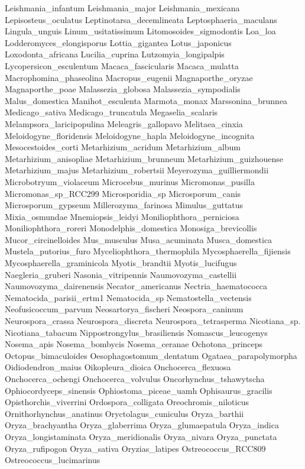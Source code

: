 \documentclass[letterpaper,10pt,english]{sphinxmanual}
\begin{document}
{\begin{sphinxVerbatim}[commandchars=\\\{\}]
Leishmania\_infantum
Leishmania\_major
Leishmania\_mexicana
Lepisosteus\_oculatus
Leptinotarsa\_decemlineata
Leptosphaeria\_maculans
Lingula\_unguis
Linum\_usitatissimum
Litomosoides\_sigmodontis
Loa\_loa
Lodderomyces\_elongisporus
Lottia\_gigantea
Lotus\_japonicus
Loxodonta\_africana
Lucilia\_cuprina
Lutzomyia\_longipalpis
Lycopersicon\_esculentum
Macaca\_fascicularis
Macaca\_mulatta
Macrophomina\_phaseolina
Macropus\_eugenii
Magnaporthe\_oryzae
Magnaporthe\_poae
Malassezia\_globosa
Malassezia\_sympodialis
Malus\_domestica
Manihot\_esculenta
Marmota\_monax
Marssonina\_brunnea
Medicago\_sativa
Medicago\_truncatula
Megaselia\_scalaris
Melampsora\_laricipopulina
Meleagris\_gallopavo
Melitaea\_cinxia
Meloidogyne\_floridensis
Meloidogyne\_hapla
Meloidogyne\_incognita
Mesocestoides\_corti
Metarhizium\_acridum
Metarhizium\_album
Metarhizium\_anisopliae
Metarhizium\_brunneum
Metarhizium\_guizhouense
Metarhizium\_majus
Metarhizium\_robertsii
Meyerozyma\_guilliermondii
Microbotryum\_violaceum
Microcebus\_murinus
Micromonas\_pusilla
Micromonas\_sp\_RCC299
Microsporidia\_sp
Microsporum\_canis
Microsporum\_gypseum
Millerozyma\_farinosa
Mimulus\_guttatus
Mixia\_osmundae
Mnemiopsis\_leidyi
Moniliophthora\_perniciosa
Moniliophthora\_roreri
Monodelphis\_domestica
Monosiga\_brevicollis
Mucor\_circinelloides
Mus\_musculus
Musa\_acuminata
Musca\_domestica
Mustela\_putorius\_furo
Myceliophthora\_thermophila
Mycosphaerella\_fijiensis
Mycosphaerella\_graminicola
Myotis\_brandtii
Myotis\_lucifugus
Naegleria\_gruberi
Nasonia\_vitripennis
Naumovozyma\_castellii
Naumovozyma\_dairenensis
Necator\_americanus
Nectria\_haematococca
Nematocida\_parisii\_ertm1
Nematocida\_sp
Nematostella\_vectensis
Neofusicoccum\_parvum
Neosartorya\_fischeri
Neospora\_caninum
Neurospora\_crassa
Neurospora\_discreta
Neurospora\_tetrasperma
Nicotiana\_sp.
Nicotiana\_tabacum
Nippostrongylus\_brasiliensis
Nomascus\_leucogenys
Nosema\_apis
Nosema\_bombycis
Nosema\_ceranae
Ochotona\_princeps
Octopus\_bimaculoides
Oesophagostomum\_dentatum
Ogataea\_parapolymorpha
Oidiodendron\_maius
Oikopleura\_dioica
Onchocerca\_flexuosa
Onchocerca\_ochengi
Onchocerca\_volvulus
Oncorhynchus\_tshawytscha
Ophiocordyceps\_sinensis
Ophiostoma\_piceae\_uamh
Ophisaurus\_gracilis
Opisthorchis\_viverrini
Ordospora\_colligata
Oreochromis\_niloticus
Ornithorhynchus\_anatinus
Oryctolagus\_cuniculus
Oryza\_barthii
Oryza\_brachyantha
Oryza\_glaberrima
Oryza\_glumaepatula
Oryza\_indica
Oryza\_longistaminata
Oryza\_meridionalis
Oryza\_nivara
Oryza\_punctata
Oryza\_rufipogon
Oryza\_sativa
Oryzias\_latipes
Ostreococcus\_RCC809
Ostreococcus\_lucimarinus

\end{sphinxVerbatim}}
\end{document}
